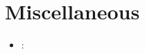 \documentclass[../main.tex]{subfiles}
\begin{document}
\section{Miscellaneous}
\begin{itemize}

    \item \ul{}: 
    
\end{itemize}
\end{document}
